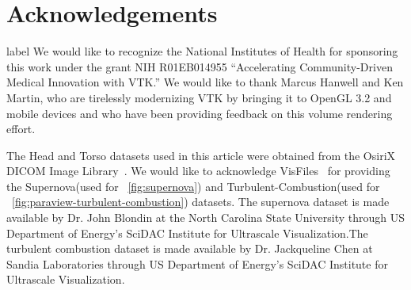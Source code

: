 \section{Acknowledgements}
label{}
We would like to recognize the National Institutes of Health for sponsoring this
work under the grant NIH R01EB014955 “Accelerating Community-Driven Medical
Innovation with VTK.” We would like to thank Marcus Hanwell and Ken Martin, who
are tirelessly modernizing VTK by bringing it to OpenGL 3.2 and mobile devices
and who have been providing feedback on this volume rendering effort.

The Head and Torso datasets used in this article were obtained from the OsiriX
DICOM Image Library~\citep{osirix_osirix_2017}. We would like to acknowledge
VisFiles~\citep{visfiles_visfiles_2007} for providing the Supernova(used for
~\autoref{fig:supernova}) and Turbulent-Combustion(used for
~\autoref{fig:paraview-turbulent-combustion}) datasets. The supernova dataset
is made available by Dr. John Blondin at the North Carolina State University
through US Department of Energy's SciDAC Institute for Ultrascale
Visualization.The turbulent combustion dataset is made available by Dr.
Jackqueline Chen at Sandia Laboratories through US Department of Energy's SciDAC
Institute for Ultrascale Visualization.
